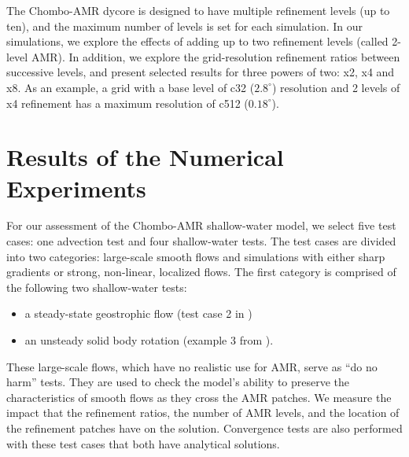The Chombo-AMR dycore is designed to have multiple refinement levels (up
to ten), and the maximum number of levels is set for each simulation.
In our simulations, we explore the effects of adding up to
two refinement levels (called 2-level AMR).  In addition, we explore the
grid-resolution refinement ratios between successive levels,
and present selected results for three powers of two: x2, x4 and x8.
As an example, a grid with a base level of
c32 ($2.8^\circ$) resolution and 2 levels of x4 refinement has
a maximum resolution of c512 ($0.18^\circ$). 

\section{Results of the Numerical Experiments}
\label{sec:results}
For our assessment of the
Chombo-AMR shallow-water model, we select five test cases: one advection
test and four shallow-water tests.  The test cases are divided into two
categories:  large-scale smooth flows and
simulations with either sharp gradients or strong, non-linear, localized
flows.  The first category is comprised of the following two
shallow-water tests:
\begin{itemize}
    \item
        a steady-state geostrophic flow (test case 2 in
        \cite{Williamson:1992kx})
    \item
        an unsteady solid body rotation (example 3 from
        \cite{Lauter:2005uq}).
\end{itemize}
These large-scale flows, which have no realistic use for AMR, serve as
``do no harm'' tests.  They are used to check the model's ability to
preserve the characteristics of smooth flows as they cross the AMR
patches.  We measure the impact that the refinement ratios, the number
of AMR levels, and the location of the refinement patches have on the
solution.  Convergence tests are also performed with these test cases that both have analytical solutions.

